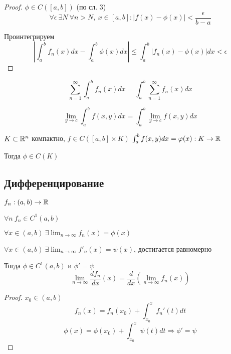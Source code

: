    \begin{proof}
        $\phi \in C([a, b])$ (по сл. 3)
        \[
            \forall \epsilon \ \exists N \ \forall n > N, \ x \in [a, b] : |f(x) - \phi(x)| < \frac{\epsilon}{b - a}    
        \]
        \par Проинтегрируем
        \[
            |\int_a^b f_n(x)dx - \int_a^b \phi(x)dx| \le \int_a^b|f_n(x) - \phi(x)| dx < \epsilon
        \]
    \end{proof}

    \begin{corollary}
        \[
            \sum_{n=1}^\infty \int_a^b f_n(x) dx  = \int_a^b \sum_{n=1}^\infty f_n(x) dx  
        \]
    \end{corollary}

    \begin{corollary}
        \[
            \lim_{y \rightarrow c} \int_a^b f(x, y) dx = \int_a^b \lim_{y \rightarrow c} f(x, y) dx    
        \]
    \end{corollary}

    \begin{corollary}
        $K \subset \mathbb{R}^n$ компактно, $f \in C([a, b] \times K)$ \quad $\int_a^b f(x, y) dx = \varphi(x) : K \rightarrow \mathbb{R}$
        \par Тогда $\phi \in C(K)$
    \end{corollary}

    \subsection*{Дифференцирование}

    \begin{theorem}
        $f_n : (a, b) \rightarrow \mathbb{R}$
        \par $\forall n \ f_n \in C^1(a, b)$
        \par $\forall x \in (a, b) \ \exists \lim_{n \rightarrow \infty} f_n(x) = \phi(x)$
        \par $\forall x \in (a, b) \ \exists \lim_{n \rightarrow \infty} f'_n(x) = \psi(x)$, достигается равномерно
        \par Тогда $\phi \in C^1(a, b)$ и $\phi' = \psi$
        \[
            \lim_{n \rightarrow \infty} \frac{d f_n}{dx}(x) = \frac{d}{dx}(\lim_{n \rightarrow \infty} f_n(x))    
        \]
    \end{theorem}

    \begin{proof}
        $x_0 \in (a, b)$
        \[
            f_n(x) = f_n(x_0) + \int_{x_0}^x f_n'(t) dt    
        \]
        \[
            \phi(x) = \phi(x_0) + \int_{x_0}^x \psi(t) dt \Rightarrow \phi' = \psi    
        \]
    \end{proof}

